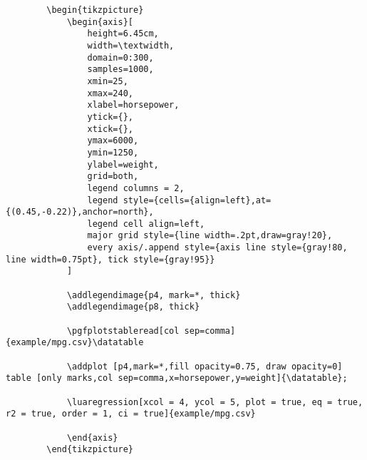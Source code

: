 \documentclass[11pt]{article}
\begin{document}
    \begin{verbatim}
        \begin{tikzpicture}
            \begin{axis}[
                height=6.45cm,
                width=\textwidth,
                domain=0:300,
                samples=1000,
                xmin=25,
                xmax=240,
                xlabel=horsepower,
                ytick={},
                xtick={},
                ymax=6000,
                ymin=1250,
                ylabel=weight,
                grid=both,
                legend columns = 2,
                legend style={cells={align=left},at={(0.45,-0.22)},anchor=north},
                legend cell align=left,
                major grid style={line width=.2pt,draw=gray!20},
                every axis/.append style={axis line style={gray!80, line width=0.75pt}, tick style={gray!95}}
            ]

            \addlegendimage{p4, mark=*, thick}
            \addlegendimage{p8, thick}

            \pgfplotstableread[col sep=comma]{example/mpg.csv}\datatable

            \addplot [p4,mark=*,fill opacity=0.75, draw opacity=0] table [only marks,col sep=comma,x=horsepower,y=weight]{\datatable};

            \luaregression[xcol = 4, ycol = 5, plot = true, eq = true, r2 = true, order = 1, ci = true]{example/mpg.csv}

            \end{axis}
        \end{tikzpicture}
    \end{verbatim}

    \pagebreak
\end{document}
